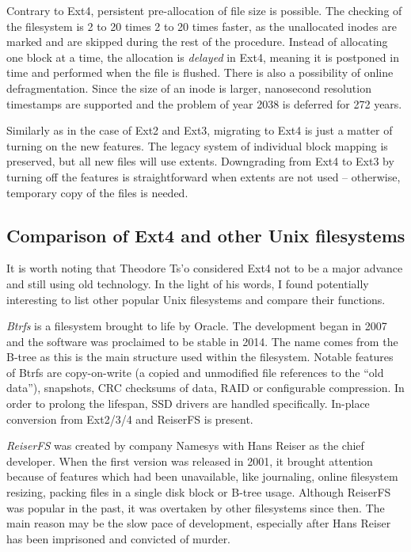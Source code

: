 \documentclass{acm_proc_article-sp}
\begin{document}
Contrary to Ext4, persistent pre-allocation of file size is possible. The checking of the filesystem is 2 to 20 times 2 to 20 times faster, as the unallocated inodes are marked and are skipped during the rest of the procedure. Instead of allocating one block at a time, the allocation is {\it delayed} in Ext4, meaning it is postponed in time and performed when the file is flushed. There is also a possibility of online defragmentation. Since the size of an inode is larger, nanosecond resolution timestamps are supported and the problem of year 2038 is deferred for 272 years.

Similarly as in the case of Ext2 and Ext3, migrating to Ext4 is just a matter of turning on the new features. The legacy system of individual block mapping is preserved, but all new files will use extents. Downgrading from Ext4 to Ext3 by turning off the features is straightforward when extents are not used -- otherwise, temporary copy of the files is needed.

\subsection{Comparison of Ext4 and other Unix filesystems}

It is worth noting that Theodore Ts'o considered Ext4 not to be a major advance and still using old technology. In the light of his words, I found potentially interesting to list other popular Unix filesystems and compare their functions.

{\it Btrfs} \cite{btrfs} is a filesystem brought to life by Oracle. The development began in 2007 and the software was proclaimed to be stable in 2014. The name comes from the B-tree as this is the main structure used within the filesystem. Notable features of Btrfs are copy-on-write (a copied and unmodified file references to the ``old data''), snapshots, CRC checksums of data, RAID or configurable compression. In order to prolong the lifespan, SSD drivers are handled specifically. In-place conversion from Ext2/3/4 and ReiserFS is present.

{\it ReiserFS} was created by company Namesys with Hans Reiser as the chief developer. When the first version was released in 2001, it brought attention because of features which had been unavailable, like journaling, online filesystem resizing, packing files in a single disk block or B-tree usage. Although ReiserFS was popular in the past, it was overtaken by other filesystems since then. The main reason may be the slow pace of development, especially after Hans Reiser has been imprisoned and convicted of murder.
\end{document}
